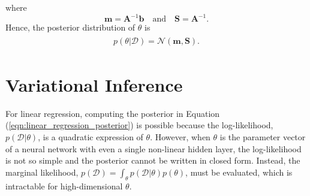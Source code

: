 \documentclass[msc,deptreport.inf]{infthesis} %
\newcommand{\matr}[1]{\mathbf{#1}}
\begin{document}
where
\begin{equation}\label{eqn:linear_regression_posterior_params}
	\matr{m} = \matr{A}^{-1} \matr{b}
	\quad \text{and} \quad 
	\matr{S} = \matr{A}^{-1}.
\end{equation}
Hence, the posterior distribution of $\theta$ is 
\begin{align}\label{eqn:linear_regression_posterior}
\begin{split}
	p(\theta | \mathcal{D}) = \mathcal{N}(\matr{m}, \matr{S}).
\end{split}
\end{align}


\section{Variational Inference}\label{sec:vi}

For linear regression, computing the posterior in Equation (\ref{eqn:linear_regression_posterior}) is possible because the log-likelihood, $p(\mathcal{D} | \theta)$, is a quadratic expression of $\theta$. However, when $\theta$ is the parameter vector of a neural network with even a single non-linear hidden layer, the log-likelihood is not so simple and the posterior cannot be written in closed form. Instead, the marginal likelihood, $p(\mathcal{D}) = \int_\theta p(\mathcal{D} | \theta) p(\theta)$, must be evaluated, which is intractable for high-dimensional $\theta$. 
\end{document}
